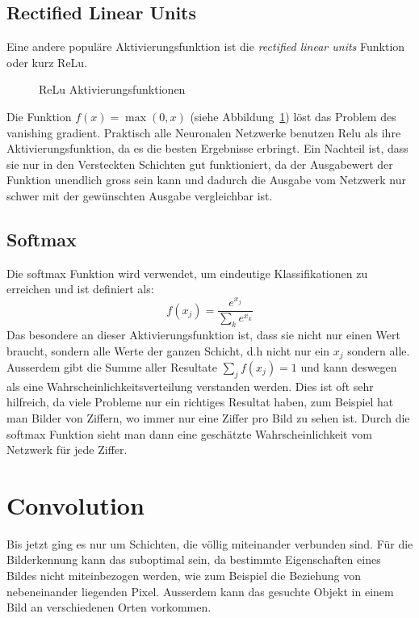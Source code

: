 \documentclass[12pt,a4paper]{report}
\begin{document}
\subsection{Rectified Linear Units}
Eine andere populäre Aktivierungsfunktion ist die \textit{rectified linear units} Funktion oder kurz ReLu.
\begin{figure}[!h]
    \centering
{}
    \caption{ReLu Aktivierungsfunktionen}
    \label{fig:activation2}
\end{figure}
Die Funktion $f(x) = \max(0, x)$ (siehe Abbildung~\ref{fig:activation2}) löst das Problem des vanishing gradient.
Praktisch alle Neuronalen Netzwerke benutzen Relu als ihre Aktivierungsfunktion,
da es die besten Ergebnisse erbringt\cite{activations}.
Ein Nachteil ist, dass sie nur in den Versteckten Schichten gut funktioniert,
da der Ausgabewert der Funktion unendlich gross sein kann und dadurch die Ausgabe vom Netzwerk nur schwer mit der gewünschten Ausgabe vergleichbar ist.
\subsection{Softmax}
Die softmax Funktion wird verwendet, um eindeutige Klassifikationen zu erreichen und ist definiert als:
\[f(x_j) = \frac{e^{x_j}}{\sum_k{e^{x_k}}}\]
Das besondere an dieser Aktivierungsfunktion ist, dass sie nicht nur einen Wert braucht, sondern alle Werte der ganzen Schicht,
d.h nicht nur ein $x_j$ sondern alle.
Ausserdem gibt die Summe aller Resultate $\sum_j f(x_j) = 1$ und kann deswegen als eine Wahrscheinlichkeitsverteilung verstanden werden.
Dies ist oft sehr hilfreich, da viele Probleme nur ein richtiges Resultat haben, zum Beispiel hat man Bilder von Ziffern,
wo immer nur eine Ziffer pro Bild zu sehen ist.
Durch die softmax Funktion sieht man dann eine geschätzte Wahrscheinlichkeit vom Netzwerk für jede Ziffer.
\section{Convolution}
Bis jetzt ging es nur um Schichten, die völlig miteinander verbunden sind.
Für die Bilderkennung kann das suboptimal sein, da bestimmte Eigenschaften eines Bildes nicht miteinbezogen werden,
wie zum Beispiel die Beziehung von nebeneinander liegenden Pixel.
Ausserdem kann das gesuchte Objekt in einem Bild an verschiedenen Orten vorkommen.
\end{document}
